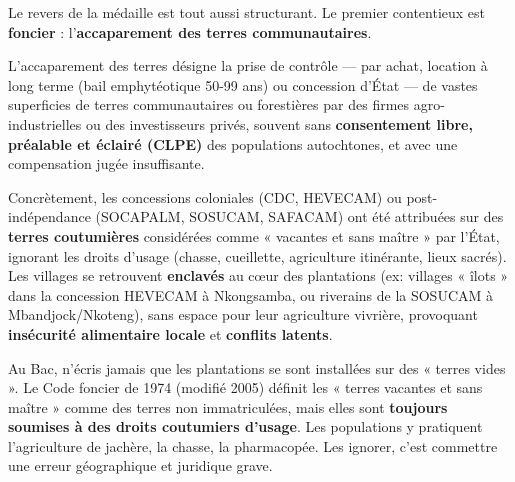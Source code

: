 \documentclass[11pt]{article}
\newcommand{\cle}[1]{{\popxbold\color{popdark}#1}}
\begin{document}
\noindent
Le revers de la médaille est tout aussi structurant. Le premier contentieux est \textbf{foncier} : l'\textbf{accaparement des terres communautaires}.

\begin{definition}
L'\cle{accaparement des terres} désigne la prise de contrôle — par achat, location à long terme (bail emphytéotique 50-99 ans) ou concession d'État — de vastes superficies de terres communautaires ou forestières par des firmes agro-industrielles ou des investisseurs privés, souvent sans \textbf{consentement libre, préalable et éclairé (CLPE)} des populations autochtones, et avec une compensation jugée insuffisante.
\end{definition}

\noindent
Concrètement, les concessions coloniales (CDC, HEVECAM) ou post-indépendance (SOCAPALM, SOSUCAM, SAFACAM) ont été attribuées sur des \textbf{terres coutumières} considérées comme « vacantes et sans maître » par l'État, ignorant les droits d'usage (chasse, cueillette, agriculture itinérante, lieux sacrés). Les villages se retrouvent \textbf{enclavés} au cœur des plantations (ex: villages « îlots » dans la concession HEVECAM à Nkongsamba, ou riverains de la SOSUCAM à Mbandjock/Nkoteng), sans espace pour leur agriculture vivrière, provoquant \textbf{insécurité alimentaire locale} et \textbf{conflits latents}.

\begin{attention}
Au Bac, n'écris jamais que les plantations se sont installées sur des « terres vides ». Le Code foncier de 1974 (modifié 2005) définit les « terres vacantes et sans maître » comme des terres non immatriculées, mais elles sont \textbf{toujours soumises à des droits coutumiers d'usage}. Les populations y pratiquent l'agriculture de jachère, la chasse, la pharmacopée. Les ignorer, c'est commettre une erreur géographique et juridique grave.
\end{attention}
\end{document}
